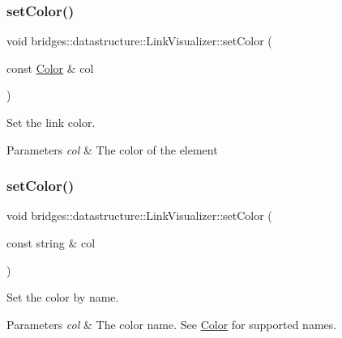 \subsubsection{\texorpdfstring{set\+Color()}{setColor()}\hspace{0.1cm}{\footnotesize\ttfamily [1/2]}}
{\footnotesize\ttfamily void bridges\+::datastructure\+::\+Link\+Visualizer\+::set\+Color (\begin{DoxyParamCaption}\item[{const \mbox{\hyperlink{classbridges_1_1datastructure_1_1_color}{Color}} \&}]{col }\end{DoxyParamCaption})\hspace{0.3cm}{\ttfamily [inline]}}



Set the link color. 


\begin{DoxyParams}{Parameters}
{\em col} & The color of the element \\
\hline
\end{DoxyParams}
\mbox{\label{classbridges_1_1datastructure_1_1_link_visualizer_af570ade2d50a8789db3b06b79e5dc589}} 
\subsubsection{\texorpdfstring{set\+Color()}{setColor()}\hspace{0.1cm}{\footnotesize\ttfamily [2/2]}}
{\footnotesize\ttfamily void bridges\+::datastructure\+::\+Link\+Visualizer\+::set\+Color (\begin{DoxyParamCaption}\item[{const string \&}]{col }\end{DoxyParamCaption})\hspace{0.3cm}{\ttfamily [inline]}}



Set the color by name. 


\begin{DoxyParams}{Parameters}
{\em col} & The color name. See \mbox{\hyperlink{classbridges_1_1datastructure_1_1_color}{Color}} for supported names. \\
\hline
\end{DoxyParams}
\mbox{\label{classbridges_1_1datastructure_1_1_link_visualizer_a20ed50bf0e02f79dda0cb54c3af722fe}} 
